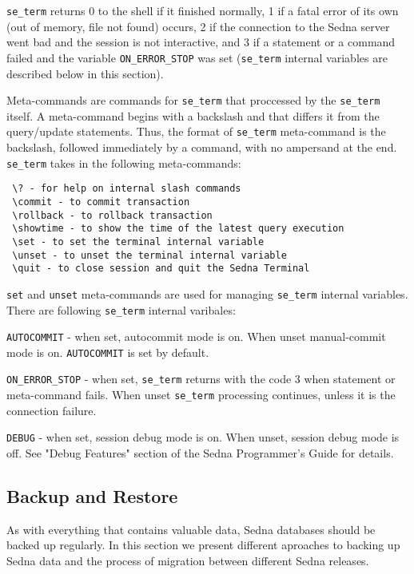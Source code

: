 \documentclass[a4paper,12pt]{article}
\begin{document}
\verb!se_term! returns 0 to the shell if it finished normally, 1 if a fatal error of its own (out of memory, file not
found) occurs, 2 if the connection to the Sedna server went bad and the session is not interactive, and 3 if
a statement or a command failed and the variable \verb!ON_ERROR_STOP! was set (\verb!se_term! internal variables are described below in this section).

Meta-commands are commands for \verb!se_term! that proccessed by the \verb!se_term! itself. A meta-command begins with a backslash and that differs it from the query/update statements. Thus, the format of \verb!se_term! meta-command is the backslash, followed immediately by a command, with no ampersand at the end. \verb!se_term! takes in the following meta-commands:

\begin{verbatim}
 \? - for help on internal slash commands
 \commit - to commit transaction
 \rollback - to rollback transaction
 \showtime - to show the time of the latest query execution
 \set - to set the terminal internal variable
 \unset - to unset the terminal internal variable
 \quit - to close session and quit the Sedna Terminal
\end{verbatim}

\verb!set! and \verb!unset! meta-commands are used for managing \verb!se_term! internal variables. There are following \verb!se_term! internal varibales:

\verb!AUTOCOMMIT! - when set, autocommit mode is on. When unset manual-commit mode is on. \verb!AUTOCOMMIT! is set by default.

\verb!ON_ERROR_STOP! - when set, \verb!se_term! returns with the code 3 when statement or meta-command fails. When unset \verb!se_term! processing continues, unless it is the connection failure.

\verb!DEBUG! - when set, session debug mode is on. When unset, session debug mode is off. See "Debug Features" section of the Sedna Programmer's Guide for details.


\subsection{Backup and Restore}

As with everything that contains valuable data, Sedna databases should be backed up regularly.
In this section we present different aproaches to backing up Sedna data and the process of 
migration between different Sedna releases.
\end{document}
